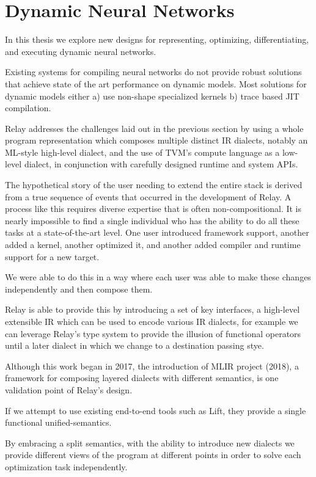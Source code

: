 \section{Dynamic Neural Networks}

In this thesis we explore new designs for representing, optimizing, differentiating, and executing dynamic neural networks.

Existing systems for compiling neural networks do not provide robust solutions that achieve state of the art performance
  on dynamic models.
Most solutions for dynamic models either a) use non-shape specialized kernels b) trace based JIT compilation.

Relay addresses the challenges laid out in the previous section by using a whole program representation which composes multiple distinct IR dialects,
  notably an ML-style high-level dialect,
  and the use of TVM’s compute language as a low-level dialect,
  in conjunction with carefully designed runtime and system APIs.

The hypothetical story of the user needing to extend the entire stack is derived from a true sequence of events that occurred in the development of Relay.
A process like this requires diverse expertise that is often non-compositional. It is nearly impossible to find a single individual who has the ability
  to do all these tasks at a state-of-the-art level.
One user introduced framework support, another added a kernel, another optimized it, and another added compiler and runtime support for a new target.

We were able to do this in a way where each user was able to make these changes independently and then compose them.

Relay is able to provide this by introducing a set of key interfaces, a high-level extensible IR which can be used to encode various IR dialects,
  for example we can leverage Relay’s type system to provide the illusion of functional operators until a later dialect in which we change
  to a destination passing stye.

Although this work began in 2017, the introduction of MLIR project (2018), a framework for composing layered dialects with different semantics,
is one validation point of Relay’s design.

If we attempt to use existing end-to-end tools such as Lift, they provide a single functional unified-semantics.

By embracing a split semantics, with the ability to introduce new dialects we provide different views of the program at different points in order to solve each optimization task independently.


